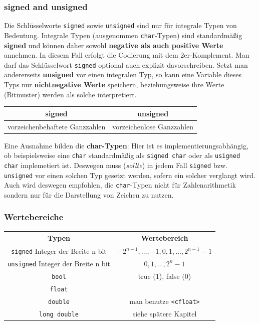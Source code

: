 \documentclass[a4paper]{report}
\begin{document}
\subsubsection{signed and unsigned}
Die Schlüsselworte \texttt{signed} sowie \texttt{unsigned} sind nur für integrale Typen von Bedeutung. Integrale Typen (ausgenommen \texttt{char}-Typen) sind standardmäßig \textbf{signed} und können daher sowohl \textbf{negative als auch positive Werte} annehmen. In diesem Fall erfolgt die Codierung mit dem 2er-Komplement. Man darf das Schlüsselwort \texttt{signed} optional auch explizit davorschreiben. Setzt man andererseits \textbf{unsigned} vor einen integralen Typ, so kann eine Variable dieses Typs nur \textbf{nichtnegative Werte} speichern, beziehungsweise ihre Werte (Bitmuster) werden als solche interpretiert.

\begin{center}
\begin{tabular}{|c|c|} \hline
	\textbf{signed} & \textbf{unsigned} \\ \hline
	vorzeichenbehaftete Ganzzahlen & vorzeichenlose Ganzzahlen \\ \hline
\end{tabular}
\end{center}
 
Eine Ausnahme bilden die \textbf{char-Typen}: Hier ist es implementierungsabhängig, ob beispielsweise eine \texttt{char} standardmäßig als \texttt{signed char} oder als \texttt{usigned char} implemetiert ist. Deswegen muss (\textit{sollte}) in jedem Fall \texttt{signed} bzw. \texttt{unsigned} vor einen solchen Typ gesetzt werden, sofern ein solcher verglangt wird. Auch wird deswegen empfohlen, die \texttt{char}-Typen nicht für Zahlenarithmetik sondern nur für die Darstellung von Zeichen zu nutzen.

\subsubsection{Wertebereiche}

\begin{center}
\begin{tabular}{|c|c|}
	\hline
	\textbf{Typen}	& \textbf{Wertebereich} \\ \hline
	\texttt{signed} Integer der Breite n bit & $-2^{n-1}, \dots , -1,0,1, \dots ,2^{n-1}-1$ \\ 
	\texttt{unsigned} Integer der Breite n bit & $0,1, \dots ,2^{n}-1$ \\\hline
	\texttt{bool} & true (1), false (0) \\ \hline
	\texttt{float} & \\
	\texttt{double} & man benutze \texttt{<cfloat>}\\%
	\texttt{long double} & siehe spätere Kapitel\\ \hline
	
\end{tabular}
\end{center}
\end{document}

